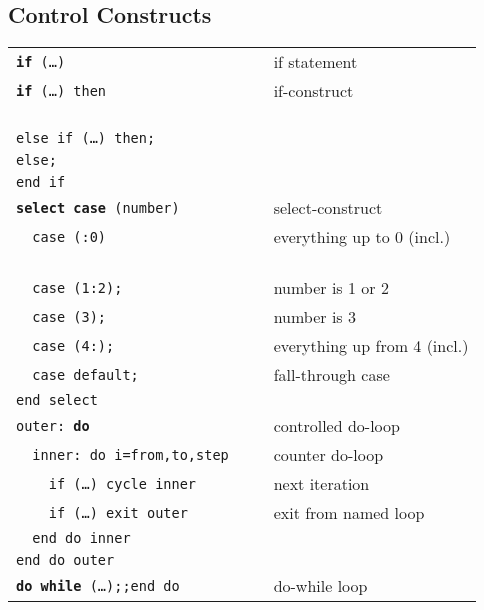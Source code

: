 \documentclass[8pt]{extarticle} %
\begin{document}
\begin{multicols}{3}
		\section{Control Constructs}
		\begin{tabular}{L{0.55\linewidth} L{0.45\linewidth}}
			\tt \textbf{if}~(\dots)~             & if statement                \\
			\tt \textbf{if}~(\dots)~then                     & if-construct                \\
			\tt ~~                                &                             \\
			\tt else~if~(\dots)~then;~            &                             \\
			\tt else;~                            &                             \\
			\tt end~if                                       &                             \\
			\tt \textbf{select case}~(number)                & select-construct            \\
			\tt ~~case~(:0)                                  & everything up to 0 (incl.)  \\
			\tt ~~~~                              &                             \\
			\tt ~~case~(1:2);                     & number is 1 or 2            \\
			\tt ~~case~(3);                       & number is 3                 \\
			\tt ~~case~(4:);                      & everything up from 4 (incl.)\\
			\tt ~~case~default;                   & fall-through case           \\
			\tt end~select                                   &                             \\
			\tt outer:~\textbf{do}                           & controlled do-loop          \\
			\tt ~~inner:~do~i=from,to,step                   & counter do-loop             \\
			\tt ~~~~if~(\dots)~cycle inner                   & next iteration              \\
			\tt ~~~~if~(\dots)~exit outer                    & exit from named loop        \\
			\tt ~~end~do~inner                               &                             \\
			\tt end~do~outer                                 &                             \\
			\tt \textbf{do while}~(\dots);;end do     & do-while loop           \\
		\end{tabular}
		

\end{multicols}
\end{document}

